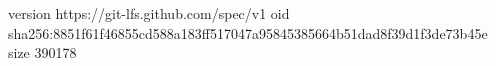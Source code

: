 version https://git-lfs.github.com/spec/v1
oid sha256:8851f61f46855cd588a183ff517047a95845385664b51dad8f39d1f3de73b45e
size 390178
